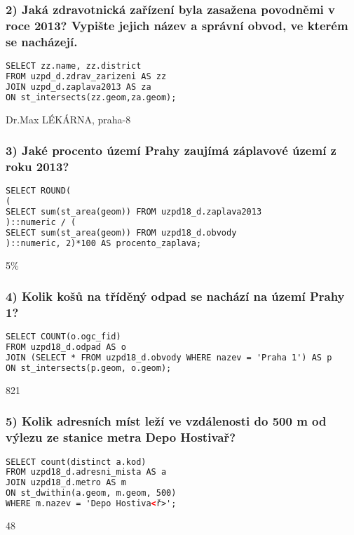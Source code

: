 \documentclass[a4paper, 12pt]{article}
\begin{document}
\subsubsection*{2) Jaká zdravotnická zařízení byla zasažena povodněmi v roce 2013? Vypište jejich název a správní obvod, ve kterém se nacházejí.}
\begin{lstlisting}[language=html]
SELECT zz.name, zz.district 
FROM uzpd_d.zdrav_zarizeni AS zz
JOIN uzpd_d.zaplava2013 AS za 
ON st_intersects(zz.geom,za.geom);
\end{lstlisting}
Dr.Max LÉKÁRNA, praha-8
\vspace{0.8cm}

\subsubsection*{3) Jaké procento území Prahy zaujímá záplavové území z roku 2013?}
\begin{lstlisting}[language=html]
SELECT ROUND(
(
SELECT sum(st_area(geom)) FROM uzpd18_d.zaplava2013
)::numeric / (
SELECT sum(st_area(geom)) FROM uzpd18_d.obvody
)::numeric, 2)*100 AS procento_zaplava;
\end{lstlisting}
5\%
\vspace{0.8cm}

\subsubsection*{4) Kolik košů na tříděný odpad se nachází na území Prahy 1?}
\begin{lstlisting}[language=html]
SELECT COUNT(o.ogc_fid) 
FROM uzpd18_d.odpad AS o
JOIN (SELECT * FROM uzpd18_d.obvody WHERE nazev = 'Praha 1') AS p
ON st_intersects(p.geom, o.geom);
\end{lstlisting}
821
\vspace{0.8cm}

\subsubsection*{5) Kolik adresních míst leží ve vzdálenosti do 500 m od výlezu ze stanice metra Depo Hostivař?}
\begin{lstlisting}[language=html]
SELECT count(distinct a.kod) 
FROM uzpd18_d.adresni_mista AS a
JOIN uzpd18_d.metro AS m
ON st_dwithin(a.geom, m.geom, 500)
WHERE m.nazev = 'Depo Hostiva<ř>';
\end{lstlisting}
48
\vspace{0.8cm}
\end{document}
